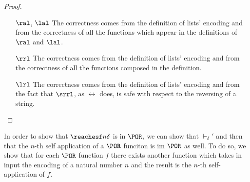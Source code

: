 \begin{conditional}{\notappendix}
\begin{proof}
\begin{itemize}
\begin{itemize}
        \end{itemize}
        \item[$\ral$, $\lal$] The correctness comes from the definition of
        lists' encoding and from the correctness of all the functions which
        appear in the definitions of $\ral$ and $\lal$.
        \item[$\rrl$] The correctness comes from the definition of
        lists' encoding and from the correctness of all the functions composed
        in the definition.
        \item[$\lrl$] The correctness comes from the definition of
        lists' encoding and from the fact that $\srrl$, as $\rel$ does, is
        safe with respect to the reversing of a string.
      \end{itemize}
    \end{proof}

    In order to show that $\reachesf n \delta$ is in $\POR$,
    we can show that $\vdash_\delta'$ and then that the $n$-th self
    application of a $\POR$ funciton is im $\POR$ as well.
    To do so, we show that for each $\POR$ function $f$ there exists another
    function which takes in input the encoding of a natural number $n$
    and the result is the $n$-th self-application of $f$.



\end{conditional}

